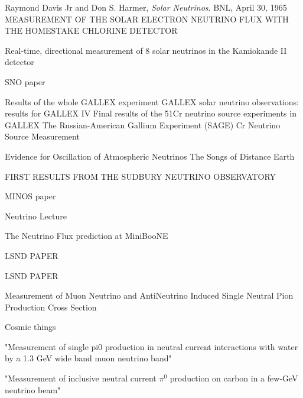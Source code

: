 \documentclass[12pt]{article}
\begin{document}
\begin{thebibliography}{10} %
  Raymond Davis Jr and Don S. Harmer,
  \emph{Solar Neutrinos}.
  BNL,
  April 30, 1965
  MEASUREMENT OF THE SOLAR ELECTRON NEUTRINO FLUX WITH THE HOMESTAKE
  CHLORINE DETECTOR
  
  Real-time, directional measurement of 8 solar neutrinos in the Kamiokande II detector

  SNO paper

	Results of the whole GALLEX experiment 
	GALLEX solar neutrino observations: results for GALLEX IV
	Final results of the 51Cr neutrino source experiments in GALLEX
The Russian-American Gallium Experiment (SAGE) Cr Neutrino Source Measurement

Evidence for Oscillation of Atmospheric Neutrinos
The Songs of Distance Earth

FIRST RESULTS FROM THE SUDBURY NEUTRINO OBSERVATORY

MINOS paper

Neutrino Lecture

The Neutrino Flux prediction at MiniBooNE

LSND PAPER

LSND PAPER

Measurement of Muon Neutrino and AntiNeutrino Induced Single Neutral Pion Production Cross Section

Cosmic things

"Measurement of single pi0 production in neutral current interactions with water by a 1.3 GeV wide band muon neutrino band"

"Measurement of inclusive neutral current $\pi^0$ production on carbon in a few-GeV neutrino beam"

\end{thebibliography}
\end{document}
